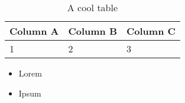 \documentclass{prace}
\begin{document}
%

\begin{table}[h] %
	\caption{A cool table}
	\label{}
	\begin{tabular}{lll}
		\toprule
		Column A & Column B & Column C \\
		\midrule
		1 & 2 & 3 \\
		\bottomrule
	\end{tabular}
\end{table}


%
\begin{itemize}
	\item Lorem
	\item Ipsum
\end{itemize}

%
\end{document}
